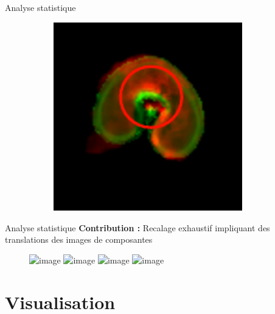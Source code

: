 \documentclass[10pt]{beamer}
\begin{document}
\begin{frame}{Analyse statistique}
\begin{figure}[ht]
\begin{subfigure}[t]{0.33\textwidth}
    \caption{}
    \label{subfig:msi_6_original}
  \end{subfigure}%
  \begin{subfigure}[t]{0.33\textwidth}
    \centering
    \includegraphics[width=0.9\textwidth]{fig/overlay_t2_6_original}
    \caption{}
    \label{subfig:overlay_t2_6_original}
  \end{subfigure}%
\end{figure}

\end{frame}


\begin{frame}{Analyse statistique}
  \textbf{Contribution :} Recalage exhaustif impliquant des translations des images de composantes


  \begin{figure}[ht]
    \centering
    \includegraphics<1>[width=0.9\textwidth]{fig/translation_nmf_0}%
    \includegraphics<2>[width=0.9\textwidth]{fig/translation_nmf_1}%
    \includegraphics<3>[width=0.9\textwidth]{fig/translation_nmf_2}%
    \includegraphics<4>[width=0.9\textwidth]{fig/translation_nmf_3}%
  \end{figure}

  
\end{frame}







\section{Visualisation}
\end{document}
